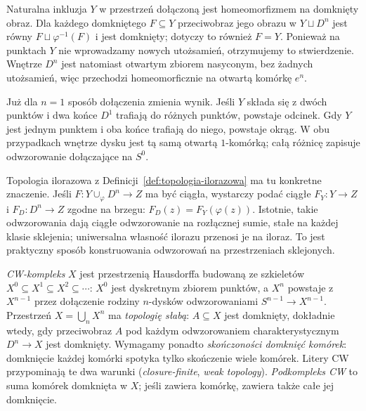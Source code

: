 Naturalna inkluzja $Y$ w przestrzeń dołączoną jest
homeomorfizmem na domknięty obraz. Dla każdego domkniętego $F\subseteq Y$
przeciwobraz jego obrazu w $Y\sqcup D^n$ jest równy
$F\sqcup\varphi^{-1}(F)$ i jest domknięty; dotyczy to również $F=Y$.
Ponieważ na punktach $Y$ nie wprowadzamy nowych utożsamień,
otrzymujemy to stwierdzenie. Wnętrze $D^n$ jest natomiast
otwartym zbiorem nasyconym, bez żadnych utożsamień, więc przechodzi
homeomorficznie na otwartą komórkę $e^n$.

Już dla $n=1$ sposób dołączenia zmienia wynik. Jeśli
$Y$ składa się z dwóch punktów i dwa końce $D^1$ trafiają
do różnych punktów, powstaje odcinek. Gdy $Y$ jest jednym
punktem i oba końce trafiają do niego, powstaje okrąg.
W obu przypadkach wnętrze dysku jest tą samą otwartą
$1$-komórką; całą różnicę zapisuje odwzorowanie
dołączające na $S^0$.

Topologia ilorazowa z
Definicji~\ref{def:topologia-ilorazowa}
ma tu konkretne znaczenie. Jeśli
$F:Y\cup_\varphi D^n\to Z$
ma być ciągła, wystarczy podać
ciągłe $F_Y:Y\to Z$ i
$F_D:D^n\to Z$ zgodne na brzegu:
$F_D(z)=F_Y(\varphi(z))$.
Istotnie, takie odwzorowania dają ciągłe
odwzorowanie na rozłącznej sumie, stałe
na każdej klasie sklejenia;
uniwersalna własność ilorazu
przenosi je na iloraz.
To jest praktyczny sposób
konstruowania odwzorowań na przestrzeniach
sklejonych.

\begin{definicja}[CW-kompleks]
\label{def:cw-kompleks}
\emph{CW-kompleks} $X$ jest przestrzenią Hausdorffa budowaną
ze szkieletów $X^0\subseteq X^1
\subseteq X^2\subseteq\cdots$:
$X^0$ jest dyskretnym zbiorem punktów,
a $X^n$ powstaje z $X^{n-1}$
przez dołączenie rodziny $n$-dysków
odwzorowaniami $S^{n-1}\to X^{n-1}$.
Przestrzeń $X=\bigcup_n X^n$
ma \emph{topologię słabą}:
$A\subseteq X$ jest domknięty,
dokładnie wtedy, gdy przeciwobraz $A$ pod każdym
odwzorowaniem charakterystycznym $D^n\to X$
jest domknięty. Wymagamy ponadto
\emph{skończoności domknięć komórek}:
domknięcie każdej komórki
spotyka tylko skończenie wiele
komórek. Litery CW przypominają
te dwa warunki
(\emph{closure-finite}, \emph{weak topology}).
\emph{Podkompleks CW} to suma komórek
domknięta w $X$; jeśli zawiera komórkę,
zawiera także całe jej domknięcie.
\end{definicja}


